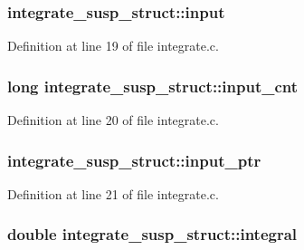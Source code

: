 \subsubsection[{\texorpdfstring{input}{input}}]{ integrate\+\_\+susp\+\_\+struct\+::input}\hypertarget{structintegrate__susp__struct_a36b7b3f37086a7b20a1b3ab4150fdfd4}{}\label{structintegrate__susp__struct_a36b7b3f37086a7b20a1b3ab4150fdfd4}


Definition at line 19 of file integrate.\+c.

\subsubsection[{\texorpdfstring{input\+\_\+cnt}{input_cnt}}]{\setlength{\rightskip}{0pt plus 5cm}long integrate\+\_\+susp\+\_\+struct\+::input\+\_\+cnt}\hypertarget{structintegrate__susp__struct_abf1bd05943e48b7202057bd004e04cd4}{}\label{structintegrate__susp__struct_abf1bd05943e48b7202057bd004e04cd4}


Definition at line 20 of file integrate.\+c.

\subsubsection[{\texorpdfstring{input\+\_\+ptr}{input_ptr}}]{ integrate\+\_\+susp\+\_\+struct\+::input\+\_\+ptr}\hypertarget{structintegrate__susp__struct_a47f94eabbd4f97bf5084dd5e46f1cd62}{}\label{structintegrate__susp__struct_a47f94eabbd4f97bf5084dd5e46f1cd62}


Definition at line 21 of file integrate.\+c.

\subsubsection[{\texorpdfstring{integral}{integral}}]{\setlength{\rightskip}{0pt plus 5cm}double integrate\+\_\+susp\+\_\+struct\+::integral}\hypertarget{structintegrate__susp__struct_a34072e8e3ef9b80ca3b6629402a4b1e9}{}\label{structintegrate__susp__struct_a34072e8e3ef9b80ca3b6629402a4b1e9}


